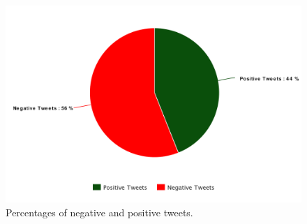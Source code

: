 \documentclass[12pt,svgnames]{report}
\begin{document}
\begin{figure}[h]
	\centering
	\includegraphics[scale=0.6]{pie_chart}
	\caption{Percentages of negative and positive tweets.}
	\label{fig:pie_chart}
\end{figure}





\end{document}
